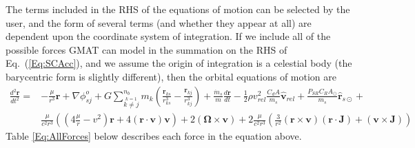 The terms included in the RHS of the equations of motion can be selected by the user, and the form of several terms (and whether they appear at all) are dependent upon the coordinate system of integration.    If we include
all of the possible forces GMAT can model in the summation on the
RHS of Eq.~(\ref{Eq:SCAcc}), and we assume the origin of integration is a celestial body (the barycentric form is slightly different), then the orbital equations of motion are
%
\begin{equation} \begin{split}
    \frac{d^2\mathbf{r}}{dt^2}
    =  &-\frac{\mu}{r^3}\mathbf{r} +  \nabla \phi_{sj}^o +
    G\sum_{\stackrel{k=1}{k \neq j}}^{n_b}m_k \left(\frac{\mathbf{r}_{ks}}{r_{ks}^3} -
     \frac{\mathbf{r}_{kj} }{r_{kj}^3}   \right)
    + %
     \frac{\dot{m}_s }{m}\frac{d\mathbf{r}}{dt}- \frac{1}{2}\rho v_{rel}^2 \frac{C_d A}{m_s}\hat{\mathbf{v}}_{rel}
     +\frac{   P_{SR}C_R A_{\odot}   }{m_s}\hat{\mathbf{r}}_{s\odot} + \\ &
         \frac{\mu}{c^2 r^3}\left(  \left( 4\frac{\mu}{r} - v^2\right)\mathbf{r} +   4(\mathbf{r}\cdot\mathbf{v})\mathbf{v}\right) + 2 (\boldsymbol{\Omega} \times \mathbf{v}) + 2 \frac{\mu}{c^2 r^3}
    \left( \frac{3}{r^2}(\mathbf{r} \times \mathbf{v})(\mathbf{r} \cdot \mathbf{J}) +(\mathbf{v}\times\mathbf{J}) \right)
     \label{Eq:CompleteEOM}
     \end{split}
\end{equation}
%
Table \ref{Eq:AllForces} below describes each force in the equation above.
%
